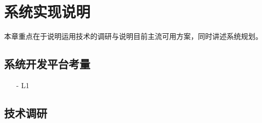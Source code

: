 \chapter{系统实现说明}
\label{chap:2}

本章重点在于说明运用技术的调研与说明目前主流可用方案，同时讲述系统规划。

\section{系统开发平台考量}

\begin{itemize}
\item [-] L1
\end{itemize}

\section{技术调研}

